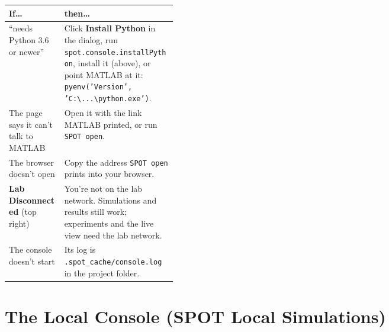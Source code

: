 \documentclass[11pt,a4paper]{article}
\newcommand{\ui}[1]{\textsf{\textbf{#1}}}
\newcommand{\pth}[1]{\texttt{#1}}
\newcommand{\fn}[1]{\texttt{#1}}
\begin{document}
\begin{xltabular}{\linewidth}{@{}>{\raggedright\arraybackslash}p{0.33\linewidth} X@{}}
\toprule
\textbf{If\ldots} & \textbf{then\ldots} \\ \midrule
``needs Python 3.6 or newer'' & Click \ui{Install Python} in the dialog, run \fn{spot.console.installPython}, install it (above), or point MATLAB at it: \fn{pyenv('Version', 'C:\textbackslash ...\textbackslash python.exe')}. \\
The page says it can't talk to MATLAB & Open it with the link MATLAB printed, or run \fn{SPOT open}. \\
The browser doesn't open & Copy the address \fn{SPOT open} prints into your browser. \\
\ui{Lab Disconnected} (top right) & You're not on the lab network. Simulations and results still work; experiments
                                   and the live view need the lab network. \\
The console doesn't start & Its log is \pth{.spot\_cache/console.log} in the project folder. \\
\bottomrule
\end{xltabular}

\section{The Local Console (SPOT Local Simulations)}
\end{document}
